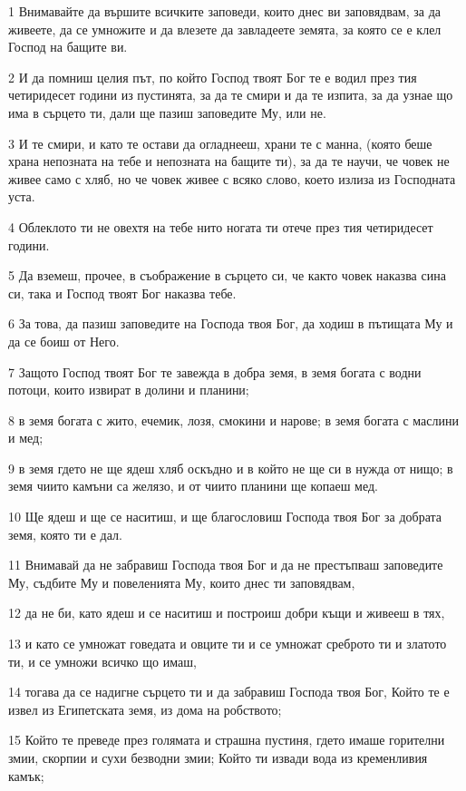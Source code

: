 \par 1 Внимавайте да вършите всичките заповеди, които днес ви заповядвам, за да живеете, да се умножите и да влезете да завладеете земята, за която се е клел Господ на бащите ви.
\par 2 И да помниш целия път, по който Господ твоят Бог те е водил през тия четиридесет години из пустинята, за да те смири и да те изпита, за да узнае що има в сърцето ти, дали ще пазиш заповедите Му, или не.
\par 3 И те смири, и като те остави да огладнееш, храни те с манна, (която беше храна непозната на тебе и непозната на бащите ти), за да те научи, че човек не живее само с хляб, но че човек живее с всяко слово, което излиза из Господната уста.
\par 4 Облеклото ти не овехтя на тебе нито ногата ти отече през тия четиридесет години.
\par 5 Да вземеш, прочее, в съображение в сърцето си, че както човек наказва сина си, така и Господ твоят Бог наказва тебе.
\par 6 За това, да пазиш заповедите на Господа твоя Бог, да ходиш в пътищата Му и да се боиш от Него.
\par 7 Защото Господ твоят Бог те завежда в добра земя, в земя богата с водни потоци, които извират в долини и планини;
\par 8 в земя богата с жито, ечемик, лозя, смокини и нарове; в земя богата с маслини и мед;
\par 9 в земя гдето не ще ядеш хляб оскъдно и в който не ще си в нужда от нищо; в земя чиито камъни са желязо, и от чиито планини ще копаеш мед.
\par 10 Ще ядеш и ще се наситиш, и ще благословиш Господа твоя Бог за добрата земя, която ти е дал.
\par 11 Внимавай да не забравиш Господа твоя Бог и да не престъпваш заповедите Му, съдбите Му и повеленията Му, които днес ти заповядвам,
\par 12 да не би, като ядеш и се наситиш и построиш добри къщи и живееш в тях,
\par 13 и като се умножат говедата и овците ти и се умножат среброто ти и златото ти, и се умножи всичко що имаш,
\par 14 тогава да се надигне сърцето ти и да забравиш Господа твоя Бог, Който те е извел из Египетската земя, из дома на робството;
\par 15 Който те преведе през голямата и страшна пустиня, гдето имаше горителни змии, скорпии и сухи безводни змии; Който ти извади вода из кременливия камък;
